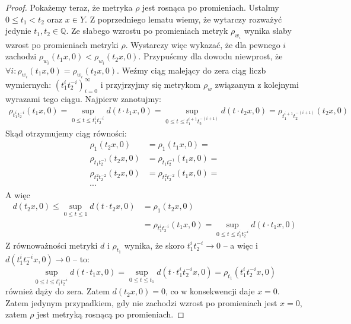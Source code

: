 \begin{thm}
\begin{proof}
    Pokażemy teraz, że metryka $\rho$ jest rosnąca po promieniach. Ustalmy $0 \leq t_1 < t_2$ oraz $x \in Y$. Z poprzedniego lematu wiemy, że wytarczy rozważyć jedynie $t_1, t_2 \in \mathbb{Q}$. Ze słabego wzrostu po promieniach metryk $\rho_{w_i}$ wynika słaby wzrost po promieniach metryki $\rho$. Wystarczy więc wykazać, że dla pewnego $i$ zachodzi $\rho_{w_i}(t_1 x, 0) < \rho_{w_i}(t_2 x, 0)$. Przypuścmy dla dowodu niewprost, że $\forall i: \rho_{w_i}(t_1 x, 0) = \rho_{w_i}(t_2 x, 0)$. Weźmy ciąg malejący do zera ciąg liczb wymiernych: $(t_1^i t_2^{-i})_{i=0}^\infty$ i przyjrzyjmy się metrykom $\rho_w$ związanym z kolejnymi wyrazami tego ciągu. Najpierw zanotujmy:
    \begin{align*}
      \rho_{t_1^i t_2^{-i}}(t_1 x, 0) = \sup_{0 \leq t \leq t_1^i t_2^{-i}} d(t \cdot t_1 x, 0) =
      \sup_{0 \leq t \leq t_1^{i+1} t_2^{-(i+1)}} d(t \cdot t_2 x, 0) = \rho_{t_1^{i+1} t_2^{-(i+1)}}(t_2 x, 0)
    \end{align*}
    Skąd otrzymujemy ciąg równości:
    \begin{align*}
      \rho_1(t_2 x, 0) &= \rho_1(t_1 x, 0) = \\
      \rho_{t_1 t_2^{-1}}(t_2 x, 0) &= \rho_{t_1 t_2^{-1}}(t_1 x, 0) = \\
      \rho_{t_1^2 t_2^{-2}}(t_2 x, 0) &= \rho_{t_1^2 t_2^{-2}}(t_1 x, 0) = \\
      \cdots
    \end{align*}
    A więc
    \begin{align*}
      d(t_2 x, 0) \leq \sup_{0 \leq t \leq 1} d(t \cdot t_2 x, 0) &= \rho_1(t_2 x, 0) \\
      &= \rho_{t_1^i t_2^{-i}}(t_1 x, 0) = \sup_{0 \leq t \leq t_1^i t_2^{-i}} d(t \cdot t_1 x, 0)
    \end{align*}
    Z równoważności metryki $d$ i $\rho_{t_1}$ wynika, że skoro $t_1^i t_2^{-i} \to 0$ -- a więc i $d(t_1^i t_2^{-i} x, 0) \to 0$ -- to:
    \[
      \sup_{0 \leq t \leq t_1^i t_2^{-i}} d(t \cdot t_1 x, 0)
      = \sup_{0 \leq t \leq t_1} d(t \cdot t_1^i t_2^{-i} x, 0)
      = \rho_{t_1}(t_1^i t_2^{-i} x, 0)
    \]
    również dąży do zera. Zatem $d(t_2 x, 0) = 0$, co w konsekwencji daje $x = 0$. Zatem jedynym przypadkiem, gdy nie zachodzi wzrost po promieniach jest $x = 0$, zatem $\rho$ jest metryką rosnącą po promieniach.
  \end{proof}
\end{thm}

